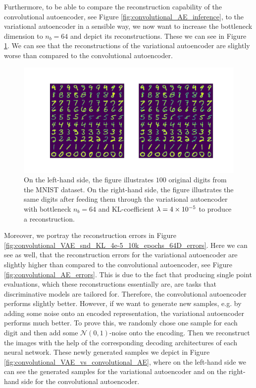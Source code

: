 Furthermore, to be able to compare the reconstruction capability of the convolutional autoencoder, see Figure \ref{fig:convolutional_AE_inference}, to the variational autoencoder in a sensible way, we now want to increase the bottleneck dimension to $n_b=64$ and depict its reconstructions. These we can see in Figure \ref{fig:convolutional_VAE_snd_KL_4e-5_10k_epochs_64D_inference}. We can see that the reconstructions of the variational autoencoder are slightly worse than compared to the convolutional autoencoder.

\begin{figure}
\begin{center}
      \includegraphics[trim = 15mm 10mm 15mm 15mm, clip, width=\linewidth]{convolutional_VAE_snd_KL_4e-5_10k_epochs_64D_inference}
\end{center}
\caption{On the left-hand side, the figure illustrates $100$ original digits from the MNIST dataset. On the right-hand side, the figure illustrates the same digits after feeding them through the variational autoencoder with bottleneck $n_b=64$ and KL-coefficient $\lambda = \num{4e-5}$ to produce a reconstruction.}\label{fig:convolutional_VAE_snd_KL_4e-5_10k_epochs_64D_inference}
\end{figure}


Moreover, we portray the reconstruction errors in Figure \ref{fig:convolutional_VAE_snd_KL_4e-5_10k_epochs_64D_errors}. Here we can see as well, that the reconstruction errors for the variational autoencoder are slightly higher than compared to the convolutional autoencoder, see Figure \ref{fig:convolutional_AE_errors}. This is due to the fact that producing single point evaluations, which these reconstructions essentially are, are tasks that discriminative models are tailored for. Therefore, the convolutional autoencoder performs slightly better. However, if we want to generate new samples, e.g. by adding some noise onto an encoded representation, the variational autoencoder performs much better. To prove this, we randomly chose one sample for each digit and then add some $\mathcal{N}(0, 1)$-noise onto the encoding. Then we reconstruct the images with the help of the corresponding decoding architectures of each neural network. These newly generated samples we depict in Figure \ref{fig:convolutional_VAE_vs_convolutional_AE}, where on the left-hand side we can see the generated samples for the variational autoencoder and on the right-hand side for the convolutional autoencoder.

